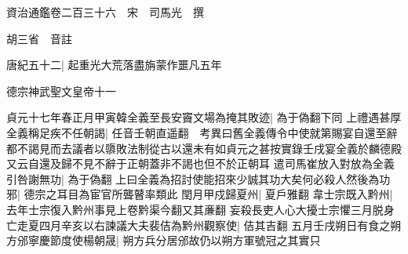 






























































資治通鑑卷二百三十六　宋　司馬光　撰

胡三省　音註

唐紀五十二|{
	起重光大荒落盡旃蒙作噩凡五年}


德宗神武聖文皇帝十一

貞元十七年春正月甲寅韓全義至長安竇文場為掩其敗迹|{
	為于偽翻下同}
上禮遇甚厚全義稱足疾不任朝謁|{
	任音壬朝直遥翻　考異曰舊全義傳令中使就第賜宴自還至辭都不謁見而去議者以隳敗法制從古以還未有如貞元之甚按實錄壬戌宴全義於麟德殿又云自還及歸不見不辭于正朝蓋非不謁也但不於正朝耳}
遣司馬崔放入對放為全義引咎謝無功|{
	為于偽翻}
上曰全義為招討使能招來少誠其功大矣何必殺人然後為功邪|{
	德宗之耳目為宦官所聾瞽率類此}
閏月甲戍歸夏州|{
	夏戶雅翻}
韋士宗既入黔州|{
	去年士宗復入黔州事見上卷黔渠今翻又其亷翻}
妄殺長吏人心大擾士宗懼三月脱身亡走夏四月辛亥以右諫議大夫裴佶為黔州觀察使|{
	佶其吉翻}
五月壬戌朔日有食之朔方邠寧慶節度使楊朝晟|{
	朔方兵分居邠故仍以朔方軍號冠之其實只}


